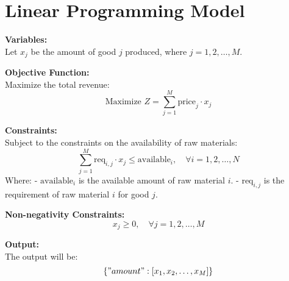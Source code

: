 \documentclass{article}
\begin{document}
\section*{Linear Programming Model}

\textbf{Variables:} \\
Let \( x_j \) be the amount of good \( j \) produced, where \( j = 1, 2, \ldots, M \).

\textbf{Objective Function:} \\
Maximize the total revenue:
\[
\text{Maximize } Z = \sum_{j=1}^{M} \text{price}_j \cdot x_j
\]

\textbf{Constraints:} \\
Subject to the constraints on the availability of raw materials:
\[
\sum_{j=1}^{M} \text{req}_{i,j} \cdot x_j \leq \text{available}_i, \quad \forall i = 1, 2, \ldots, N
\]
Where:
- \( \text{available}_i \) is the available amount of raw material \( i \).
- \( \text{req}_{i,j} \) is the requirement of raw material \( i \) for good \( j \).

\textbf{Non-negativity Constraints:} \\
\[
x_j \geq 0, \quad \forall j = 1, 2, \ldots, M
\]

\textbf{Output:} \\
The output will be:
\[
\{ "amount": [x_1, x_2, \ldots, x_M] \}
\]
\end{document}
